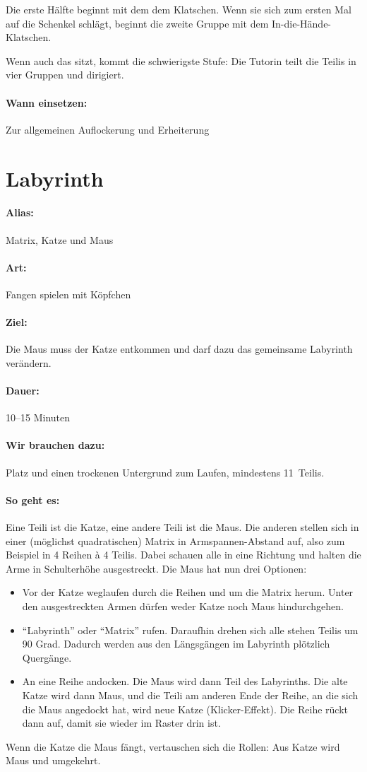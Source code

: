 Die erste Hälfte beginnt mit dem dem Klatschen. Wenn sie sich zum ersten Mal auf die Schenkel schlägt, beginnt die zweite Gruppe mit dem In-die-Hände-Klatschen.

Wenn auch das sitzt, kommt die schwierigste Stufe: Die Tutorin teilt die Teilis in vier Gruppen und dirigiert.
\paragraph{Wann einsetzen:} Zur allgemeinen Auflockerung und Erheiterung

\section{Labyrinth}
\paragraph{Alias:} Matrix, Katze und Maus
\paragraph{Art:} Fangen spielen mit Köpfchen
\paragraph{Ziel:} Die Maus muss der Katze entkommen und darf dazu das gemeinsame Labyrinth verändern.
\paragraph{Dauer:} 10--15 Minuten
\paragraph{Wir brauchen dazu:} Platz und einen trockenen Untergrund zum Laufen, mindestens 11~Teilis.
\paragraph{So geht es:} Eine Teili ist die Katze, eine andere Teili ist die Maus. Die anderen stellen sich in einer (möglichst quadratischen) Matrix in Armspannen-Abstand auf, also zum Beispiel in 4 Reihen \`{a} 4 Teilis. Dabei schauen alle in eine Richtung und halten die Arme in Schulterhöhe ausgestreckt. Die Maus hat nun drei Optionen:
\begin{itemize}
	\item Vor der Katze weglaufen durch die Reihen und um die Matrix herum. Unter den ausgestreckten Armen dürfen weder Katze noch Maus hindurchgehen.
	\item "`Labyrinth"' oder "`Matrix"' rufen. Daraufhin drehen sich alle stehen Teilis um 90 Grad. Dadurch werden aus den Längsgängen im Labyrinth plötzlich Quergänge.
	\item An eine Reihe andocken. Die Maus wird dann Teil des Labyrinths. Die alte Katze wird dann Maus, und die Teili am anderen Ende der Reihe, an die sich die Maus angedockt hat, wird neue Katze (Klicker-Effekt). Die Reihe rückt dann auf, damit sie wieder im Raster drin ist.
\end{itemize}
Wenn die Katze die Maus fängt, vertauschen sich die Rollen: Aus Katze wird Maus und umgekehrt.
